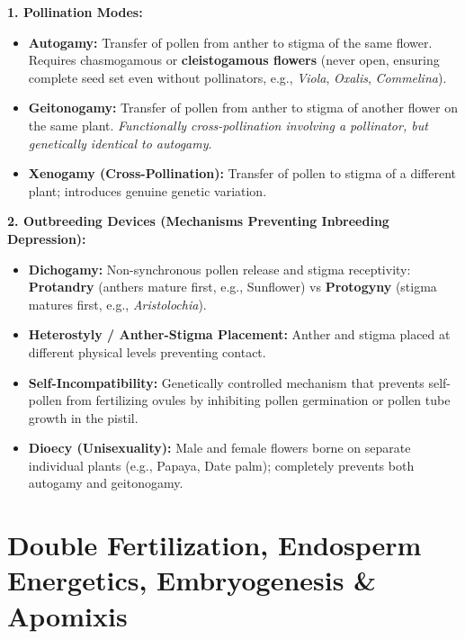 \documentclass[10pt,twoside,openright]{book}
\begin{document}
\begin{conceptbox}
\textbf{1. Pollination Modes:}
\begin{itemize}
  \item \textbf{Autogamy:} Transfer of pollen from anther to stigma of the same flower. Requires chasmogamous or \textbf{cleistogamous flowers} (never open, ensuring complete seed set even without pollinators, e.g., \textit{Viola}, \textit{Oxalis}, \textit{Commelina}).
  \item \textbf{Geitonogamy:} Transfer of pollen from anther to stigma of another flower on the same plant. \textit{Functionally cross-pollination involving a pollinator, but genetically identical to autogamy}.
  \item \textbf{Xenogamy (Cross-Pollination):} Transfer of pollen to stigma of a different plant; introduces genuine genetic variation.
\end{itemize}

\textbf{2. Outbreeding Devices (Mechanisms Preventing Inbreeding Depression):}
\begin{itemize}
  \item \textbf{Dichogamy:} Non-synchronous pollen release and stigma receptivity: \textbf{Protandry} (anthers mature first, e.g., Sunflower) vs \textbf{Protogyny} (stigma matures first, e.g., \textit{Aristolochia}).
  \item \textbf{Heterostyly / Anther-Stigma Placement:} Anther and stigma placed at different physical levels preventing contact.
  \item \textbf{Self-Incompatibility:} Genetically controlled mechanism that prevents self-pollen from fertilizing ovules by inhibiting pollen germination or pollen tube growth in the pistil.
  \item \textbf{Dioecy (Unisexuality):} Male and female flowers borne on separate individual plants (e.g., Papaya, Date palm); completely prevents both autogamy and geitonogamy.
\end{itemize}
\end{conceptbox}

\section{Double Fertilization, Endosperm Energetics, Embryogenesis \& Apomixis}
\end{document}
